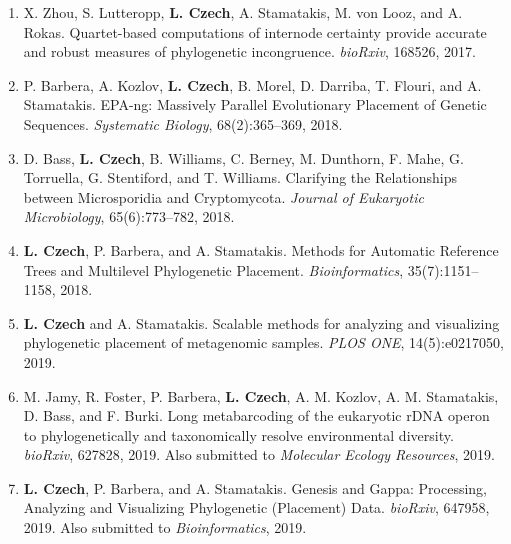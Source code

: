 \begin{enumerate}
    \item X. Zhou, S. Lutteropp, \textbf{L. Czech}, A. Stamatakis, M. von Looz, and A. Rokas.
        Quartet-based computations of internode certainty provide accurate and robust measures of phylogenetic incongruence.
        \textit{bioRxiv}, 168526, 2017. %

    \item P. Barbera, A. Kozlov, \textbf{L. Czech}, B. Morel, D. Darriba, T. Flouri, and A. Stamatakis.
        EPA-ng: Massively Parallel Evolutionary Placement of Genetic Sequences.
        \textit{Systematic Biology}, 68(2):365--369, 2018. %

    \item D. Bass, \textbf{L. Czech}, B. Williams, C. Berney, M. Dunthorn, F. Mahe, G. Torruella, G. Stentiford, and T. Williams.
        Clarifying the Relationships between Microsporidia and Cryptomycota.
        \textit{Journal of Eukaryotic Microbiology}, 65(6):773--782, 2018. %

    \item \textbf{L. Czech}, P. Barbera, and A. Stamatakis.
        Methods for Automatic Reference Trees and Multilevel Phylogenetic Placement.
        \textit{Bioinformatics}, 35(7):1151--1158, 2018. %

    \item \textbf{L. Czech} and A. Stamatakis.
        Scalable methods for analyzing and visualizing phylogenetic placement of metagenomic samples.
        \textit{PLOS ONE}, 14(5):e0217050, 2019. %
        
    \item M. Jamy, R. Foster, P. Barbera, \textbf{L. Czech}, A. M. Kozlov, A. M. Stamatakis, D. Bass, and F. Burki.
        Long metabarcoding of the eukaryotic rDNA operon to phylogenetically and taxonomically resolve environmental diversity.
        \textit{bioRxiv}, 627828, 2019. %
        Also submitted to \textit{Molecular Ecology Resources}, 2019.

    \item \textbf{L. Czech}, P. Barbera, and A. Stamatakis.
        Genesis and Gappa: Processing, Analyzing and Visualizing Phylogenetic (Placement) Data.
        \textit{bioRxiv}, 647958, 2019. %
        Also submitted to \textit{Bioinformatics}, 2019.
    
\end{enumerate}

\clearpage
